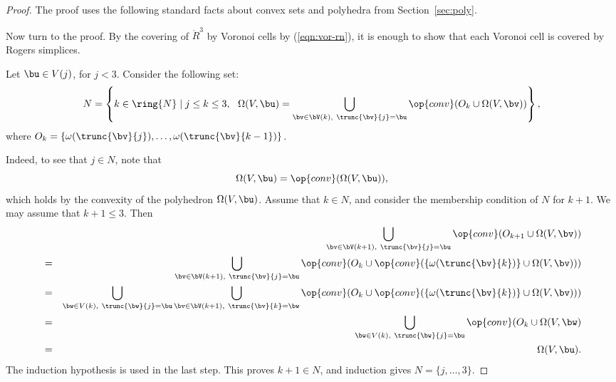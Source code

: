 \begin{proof} 
The proof uses the following standard facts about convex sets and polyhedra from
Section~\ref{sec:poly}.


%
Now turn to the proof.  
By the covering of $\ring{R}^3$  by Voronoi cells by (\ref{eqn:vor-rn}),
it is enough to show that each Voronoi cell is covered by Rogers simplices.

Let $\bu\in V(j)$, for $j<3$.
Consider the following set:
\begin{displaymath} 
N = \left\{k\in\ring{N}\mid j\le k\le 3, ~~\Omega(V,\bu) 
= \bigcup_{\bv \in \bV(k),~\trunc{\bv}{j}=\bu}
\op{conv}(O_k \cup\Omega(V,\bv)) %
\right\},
\end{displaymath}
where $O_k = \{\omega(\trunc{\bv}{j}),\ldots,\omega(\trunc{\bv}{k-1})\}$.

  Indeed, to see that $j\in N$, note that
\begin{displaymath} 
\Omega(V,\bu) = \op{conv}(\Omega(V,\bu)),
\end{displaymath}
which holds by the convexity of the polyhedron $\Omega(V,\bu)$.
Assume that $k\in N$, and consider the membership condition of $N$  for
$k+1$.  We may assume that $k+1\le 3$.
Then
\begin{eqnarray*} 
&\phantom{=}&\bigcup _{\bv \in \bV(k+1),~\trunc{\bv}{j}=\bu}
\op{conv}(O_{k+1} \cup\Omega(V,\bv))
%
\vspace{6pt}\\
&=&\bigcup _{\bv \in \bV(k+1),~\trunc{\bv}{j}=\bu}
\op{conv}(O_{k} \cup\op{conv}(\{\omega(\trunc{\bv}{k})\}\cup\Omega(V,\bv)))
\vspace{6pt}\\
&=&\bigcup _{\bw\in V(k),~\trunc{\bw}{j}=\bu}
\bigcup_{\bv \in \bV(k+1),~\trunc{\bv}{k}=\bw}
\op{conv}(O_{k} \cup\op{conv}(\{\omega(\trunc{\bv}{k})\}\cup\Omega(V,\bv)))
\vspace{6pt}\\
&=&\bigcup _{\bw\in V(k),~\trunc{\bw}{j}=\bu}
\op{conv}(O_{k} \cup \Omega(V,\bw)    
\vspace{6pt}\\
&=&\quad\Omega(V,\bu).
\end{eqnarray*}
The induction hypothesis is used in the last step.  
This proves $k+1\in N$, and induction gives $N=\{j,\ldots,3\}$.


\end{proof}
